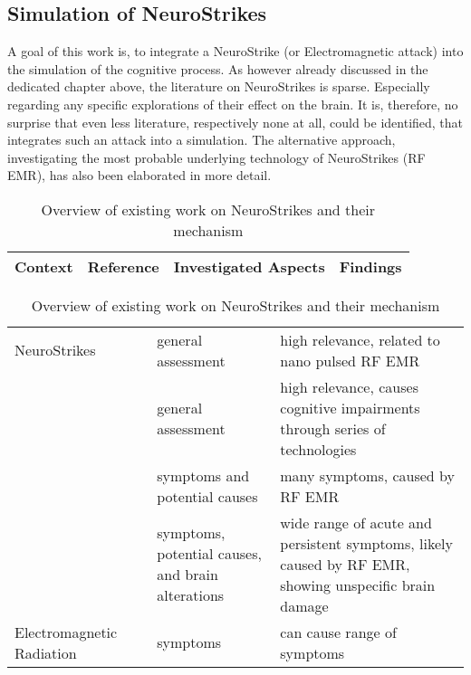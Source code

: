     \subsection{Simulation of NeuroStrikes}
    A goal of this work is, to integrate a NeuroStrike (or Electromagnetic attack) into the simulation of the cognitive process. As however already discussed in the dedicated chapter above, the literature on NeuroStrikes is sparse. Especially regarding any specific explorations of their effect on the brain. It is, therefore, no surprise that even less literature, respectively none at all, could be identified, that integrates such an attack into a simulation. The alternative approach, investigating the most probable underlying technology of NeuroStrikes (RF EMR), has also been elaborated in more detail.

    \begin{table}[htbp]
        \centering
        \caption{Overview of existing work on NeuroStrikes and their mechanism}
        \begin{tabular}{@{}m{3cm} m{2.5cm} m{4cm} m{5cm}@{}}
            \toprule
            \textbf{Context} & \textbf{Reference} & \textbf{Investigated Aspects} & \textbf{Findings} \\ 
            \midrule
        \end{tabular}
        \renewcommand{\arraystretch}{1.3}
        \begin{tabular}{@{}p{2.9cm} p{2.5cm} p{4cm} p{5cm}@{}}
            NeuroStrikes 
                & \small{\textcite{McCreight.2024}} & \small{general assessment} & \small{high relevance, related to nano pulsed RF EMR} \\
                & \small{\textcite{EADS.2023}} & \small{general assessment} & \small{high relevance, causes cognitive impairments through \newline series of technologies} \\ 
                & \small{\textcite{McCreight.2022}} & \small{symptoms and potential causes} & \small{many symptoms, caused by RF EMR} \\
                & \small{\textcite{Pavlin.2020}} & \small{symptoms, potential causes, and brain \newline alterations} & \small{wide range of acute and persistent symptoms, likely caused by RF EMR, showing unspecific brain damage} \\ 
        \midrule
            Electromagnetic Radiation
                & \small{\textcite{Narayanan.2019}} & \small{symptoms} & \small{can cause range of symptoms} \\

\end{tabular}
\end{table}
